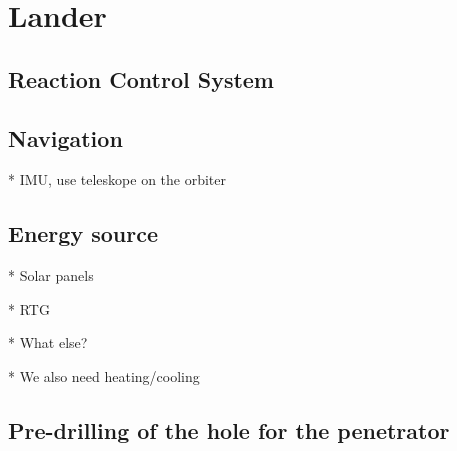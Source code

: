 \chapter{Lander}





\section{Reaction Control System}



\section{Navigation}

* IMU, use teleskope on the orbiter

\section{Energy source}

* Solar panels

* RTG

* What else?

* We also need heating/cooling

\section{Pre-drilling of the hole for the penetrator}
